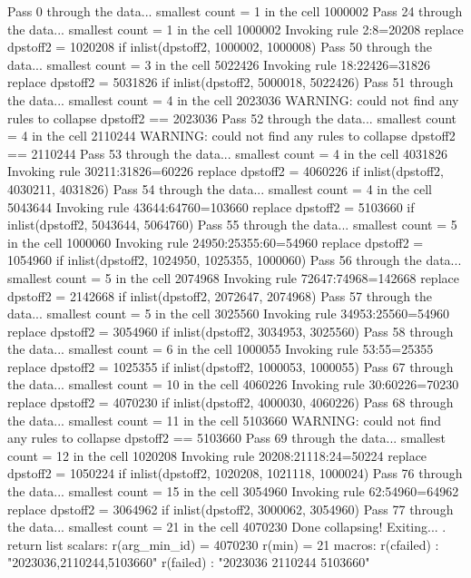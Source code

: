 Pass 0 through the data...
  smallest count = 1 in the cell      1000002
Pass 24 through the data...
  smallest count = 1 in the cell      1000002
  Invoking rule 2:8=20208
  replace dpstoff2 = 1020208 if inlist(dpstoff2, 1000002, 1000008)
\smallskip
\oom
\smallskip
Pass 50 through the data...
  smallest count = 3 in the cell      5022426
  Invoking rule 18:22426=31826
  replace dpstoff2 = 5031826 if inlist(dpstoff2, 5000018, 5022426)
Pass 51 through the data...
  smallest count = 4 in the cell      2023036
  WARNING: could not find any rules to collapse dpstoff2 == 2023036
Pass 52 through the data...
  smallest count = 4 in the cell      2110244
  WARNING: could not find any rules to collapse dpstoff2 == 2110244
Pass 53 through the data...
  smallest count = 4 in the cell      4031826
  Invoking rule 30211:31826=60226
  replace dpstoff2 = 4060226 if inlist(dpstoff2, 4030211, 4031826)
Pass 54 through the data...
  smallest count = 4 in the cell      5043644
  Invoking rule 43644:64760=103660
  replace dpstoff2 = 5103660 if inlist(dpstoff2, 5043644, 5064760)
Pass 55 through the data...
  smallest count = 5 in the cell      1000060
  Invoking rule 24950:25355:60=54960
  replace dpstoff2 = 1054960 if inlist(dpstoff2, 1024950, 1025355, 1000060)
Pass 56 through the data...
  smallest count = 5 in the cell      2074968
  Invoking rule 72647:74968=142668
  replace dpstoff2 = 2142668 if inlist(dpstoff2, 2072647, 2074968)
Pass 57 through the data...
  smallest count = 5 in the cell      3025560
  Invoking rule 34953:25560=54960
  replace dpstoff2 = 3054960 if inlist(dpstoff2, 3034953, 3025560)
Pass 58 through the data...
  smallest count = 6 in the cell      1000055
  Invoking rule 53:55=25355
  replace dpstoff2 = 1025355 if inlist(dpstoff2, 1000053, 1000055)
\smallskip
\oom
\smallskip
Pass 67 through the data...
  smallest count = 10 in the cell      4060226
  Invoking rule 30:60226=70230
  replace dpstoff2 = 4070230 if inlist(dpstoff2, 4000030, 4060226)
Pass 68 through the data...
  smallest count = 11 in the cell      5103660
  WARNING: could not find any rules to collapse dpstoff2 == 5103660
Pass 69 through the data...
  smallest count = 12 in the cell      1020208
  Invoking rule 20208:21118:24=50224
  replace dpstoff2 = 1050224 if inlist(dpstoff2, 1020208, 1021118, 1000024)
\smallskip
\oom
\smallskip
\cnp
Pass 76 through the data...
  smallest count = 15 in the cell      3054960
  Invoking rule 62:54960=64962
  replace dpstoff2 = 3064962 if inlist(dpstoff2, 3000062, 3054960)
Pass 77 through the data...
  smallest count = 21 in the cell      4070230
  Done collapsing! Exiting...
{\smallskip}
. return list
{\smallskip}
scalars:
         r(arg_min_id) =  4070230
                r(min) =  21
{\smallskip}
macros:
            r(cfailed) : "2023036,2110244,5103660"
             r(failed) : "2023036 2110244 5103660"

